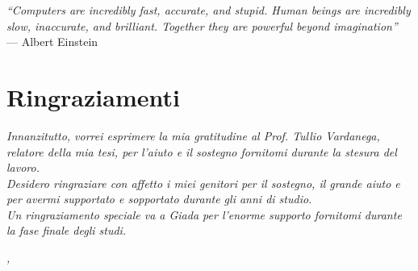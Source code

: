 
\cleardoublepage
{}
{}

\begin{flushright}{
	\slshape    
	``Computers are incredibly fast, accurate, and stupid. Human beings are incredibly slow, inaccurate, and brilliant. Together they are powerful beyond imagination''} \\ 
	\medskip
    --- Albert Einstein
\end{flushright}






\bigskip

\begingroup
\let\clearpage\relax
\let\cleardoublepage\relax
\let\cleardoublepage\relax

\chapter*{Ringraziamenti}

\noindent \textit{Innanzitutto, vorrei esprimere la mia gratitudine al Prof. Tullio Vardanega, relatore della mia tesi, per l'aiuto e il sostegno fornitomi durante la stesura del lavoro.}\\

\noindent \textit{Desidero ringraziare con affetto i miei genitori per il sostegno, il grande aiuto e per avermi supportato e sopportato durante gli anni di studio.}\\

\noindent \textit{Un ringraziamento speciale va a Giada per l'enorme supporto fornitomi durante la fase finale degli studi.}\\
\bigskip

\noindent\textit{\myLocation, \myTime}
\hfill \myName

\endgroup

